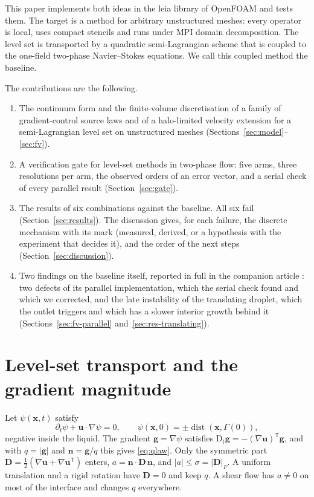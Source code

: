 \documentclass[preprint,3p,11pt]{elsarticle}
\newcommand{\psilev}{\psi}
\newcommand{\nhat}{\mathbf{n}}
\newcommand{\bu}{\mathbf{u}}
\newcommand{\bx}{\mathbf{x}}
\newcommand{\Dt}{\mathrm{D}_t}
\begin{document}
This paper implements both ideas in the leia library of OpenFOAM
\cite{WellerEtAl1998,LEIA} and tests them. The target is a method for arbitrary
unstructured meshes: every operator is local, uses compact stencils and runs under
MPI domain decomposition. The level set is transported by a quadratic
semi-Lagrangian scheme \cite{StaniforthCote1991} that is coupled to the one-field
two-phase Navier--Stokes equations. We call this coupled method the baseline.

The contributions are the following.
\begin{enumerate}
  \item The continuum form and the finite-volume discretisation of a family of
  gradient-control source laws and of a halo-limited velocity extension for a
  semi-Lagrangian level set on unstructured meshes (Sections~\ref{sec:model}--\ref{sec:fv}).
  \item A verification gate for level-set methods in two-phase flow: five arms, three
  resolutions per arm, the observed orders of an error vector, and a serial check of
  every parallel result (Section~\ref{sec:gate}).
  \item The results of six combinations against the baseline. All six fail
  (Section~\ref{sec:results}). The discussion gives, for each failure, the discrete
  mechanism with its mark (measured, derived, or a hypothesis with the experiment that
  decides it), and the order of the next steps (Section~\ref{sec:discussion}).
  \item Two findings on the baseline itself, reported in full in the companion
  article \cite{maric2026sl}: two defects of its parallel implementation, which the
  serial check found and which we corrected, and the late instability of the
  translating droplet, which the outlet triggers and which has a slower interior growth
  behind it (Sections~\ref{sec:fv-parallel} and~\ref{sec:res-translating}).
\end{enumerate}

\section{Level-set transport and the gradient magnitude}
\label{sec:levelset}

Let $\psilev(\bx,t)$ satisfy
\begin{equation}
  \partial_t\psilev+\bu\cdot\nabla\psilev = 0,\qquad
  \psilev(\bx,0)=\pm\operatorname{dist}(\bx,\Gamma(0)),
  \label{eq:transport}
\end{equation}
negative inside the liquid. The gradient $\mathbf g=\nabla\psilev$ satisfies
$\Dt\mathbf g=-(\nabla\bu)^{\mathsf T}\mathbf g$, and with $q=|\mathbf g|$ and
$\nhat=\mathbf g/q$ this gives \eqref{eq:qlaw}. Only the symmetric part
$\mathbf D=\frac12(\nabla\bu+\nabla\bu^{\mathsf T})$ enters, $a=\nhat\cdot\mathbf D\,\nhat$,
and $|a|\le\sigma=|\mathbf D|_F$. A uniform translation and a rigid rotation have
$\mathbf D=0$ and keep $q$. A shear flow has $a\neq0$ on most of the interface and
changes $q$ everywhere.
\end{document}
